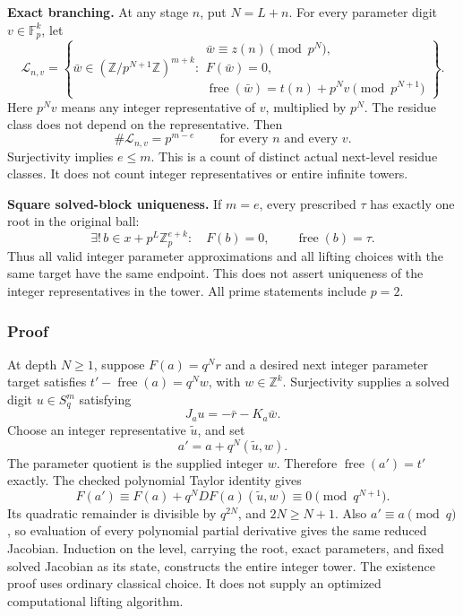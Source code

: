 \textbf{Exact branching.} At any stage \(n\), put \(N=L+n\). For every
parameter digit \(v\in\mathbb F_p^k\), let \[
\mathcal L_{n,v}=\left\{\bar w\in(\mathbb Z/p^{N+1}\mathbb Z)^{m+k}:
\begin{array}{l}
\bar w\equiv z(n)\pmod{p^N},\\
F(\bar w)=0,\\
\operatorname{free}(\bar w)=t(n)+p^Nv\pmod{p^{N+1}}
\end{array}\right\}.
\] Here \(p^Nv\) means any integer representative of \(v\), multiplied
by \(p^N\). The residue class does not depend on the representative.
Then \[
\#\mathcal L_{n,v}=p^{m-e}\qquad\text{for every }n\text{ and every }v.
\] Surjectivity implies \(e\le m\). This is a count of distinct actual
next-level residue classes. It does not count integer representatives or
entire infinite towers.

\textbf{Square solved-block uniqueness.} If \(m=e\), every prescribed
\(\tau\) has exactly one root in the original ball: \[
\exists!\,b\in x+p^L\mathbb Z_p^{e+k}:\quad
F(b)=0,\qquad\operatorname{free}(b)=\tau.
\] Thus all valid integer parameter approximations and all lifting
choices with the same target have the same endpoint. This does not
assert uniqueness of the integer representatives in the tower. All prime
statements include \(p=2\).

\hypertarget{cont9:proof}{%
\subsubsection{Proof}\label{cont9:proof}}

At depth \(N\ge1\), suppose \(F(a)=q^Nr\) and a desired next integer
parameter target satisfies \(t'-\operatorname{free}(a)=q^Nw\), with
\(w\in\mathbb Z^k\). Surjectivity supplies a solved digit \(u\in S_q^m\)
satisfying \[
J_a u=-\bar r-K_a\bar w.
\] Choose an integer representative \(\widetilde u\), and set \[
a'=a+q^N(\widetilde u,w).
\] The parameter quotient is the supplied integer \(w\). Therefore
\(\operatorname{free}(a')=t'\) exactly. The checked polynomial Taylor
identity gives \[
F(a')\equiv F(a)+q^NDF(a)(\widetilde u,w)
\equiv0\pmod{q^{N+1}}.
\] Its quadratic remainder is divisible by \(q^{2N}\), and
\(2N\ge N+1\). Also \(a'\equiv a\pmod q\), so evaluation of every
polynomial partial derivative gives the same reduced Jacobian. Induction
on the level, carrying the root, exact parameters, and fixed solved
Jacobian as its state, constructs the entire integer tower. The
existence proof uses ordinary classical choice. It does not supply an
optimized computational lifting algorithm.

